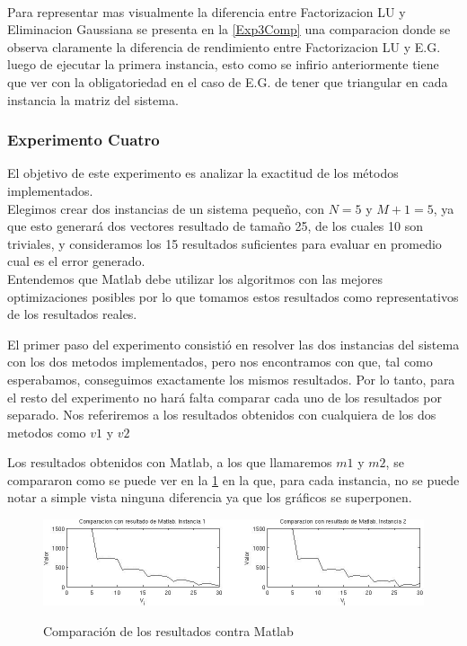 \documentclass[12pt,a4paper]{article}
\begin{document}
\\
Para representar mas visualmente  la diferencia entre Factorizacion LU y Eliminacion Gaussiana se presenta en la \ref{Exp3Comp} una comparacion donde se observa claramente la diferencia de rendimiento entre Factorizacion LU y E.G. luego de ejecutar la primera instancia, esto como se infirio anteriormente tiene que ver con la obligatoriedad en el caso de E.G. de tener que triangular en cada instancia la matriz del sistema. 

\subsubsection{Experimento Cuatro}

El objetivo de este experimento es analizar la exactitud de los métodos implementados.\\
Elegimos crear dos instancias de un sistema pequeño, con $N = 5$ y $M+1 = 5$, ya que esto generará dos vectores resultado de tamaño 25, de los cuales 10 son triviales, y consideramos los 15 resultados suficientes para evaluar en promedio cual es el error generado. \\

Entendemos que Matlab debe utilizar los algoritmos con las mejores optimizaciones posibles por lo que tomamos estos resultados como representativos de los resultados reales. 

El primer paso del experimento consistió en resolver las dos instancias del sistema con los dos metodos implementados, pero nos encontramos con que, tal como esperabamos, conseguimos exactamente los mismos resultados. Por lo tanto, para el resto del experimento no hará falta comparar cada uno de los resultados por separado. Nos referiremos a los resultados obtenidos con cualquiera de los dos metodos como $v1$ y $v2$

Los resultados obtenidos con Matlab, a los que llamaremos $m1$ y $m2$, se compararon como se puede ver en la \ref{CompML} en la que, para cada instancia, no se puede notar a simple vista ninguna diferencia ya que los gráficos se superponen.

\begin{figure}[h!]
\centering
\caption{Comparación de los resultados contra Matlab}
\includegraphics[width=17cm]{ComparacionML.jpg}
\label{CompML}
\end{figure}
\end{document}

